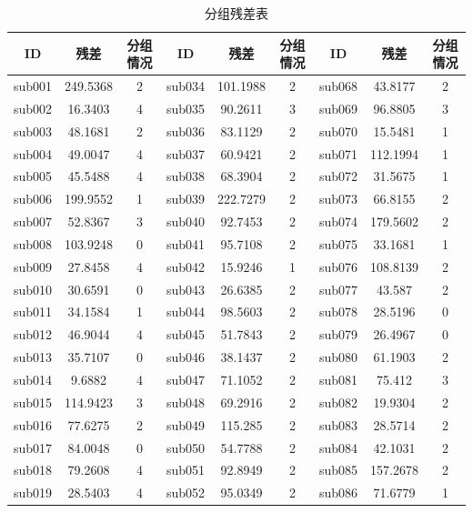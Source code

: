 \documentclass[bwprint]{gmcmthesis}
\begin{document}
\begin{table}[!ht]
    \centering
    \begin{spacing}{0.7}
    \caption{分组残差表}
    \label{分组残差表}
    \begin{tabular}{ccccccccc}
    \hline
        ID & 残差 & 分组情况 & ID & 残差 & 分组情况 & ID & 残差 & 分组情况 \\ \hline
        sub001 & 249.5368 & 2 & sub034 & 101.1988 & 2 & sub068 & 43.8177 & 2 \\ 
        sub002 & 16.3403 & 4 & sub035 & 90.2611 & 3 & sub069 & 96.8805 & 3 \\ 
        sub003 & 48.1681 & 2 & sub036 & 83.1129 & 2 & sub070 & 15.5481 & 1 \\ 
        sub004 & 49.0047 & 4 & sub037 & 60.9421 & 2 & sub071 & 112.1994 & 1 \\ 
        sub005 & 45.5488 & 4 & sub038 & 68.3904 & 2 & sub072 & 31.5675 & 1 \\ 
        sub006 & 199.9552 & 1 & sub039 & 222.7279 & 2 & sub073 & 66.8155 & 2 \\ 
        sub007 & 52.8367 & 3 & sub040 & 92.7453 & 2 & sub074 & 179.5602 & 2 \\ 
        sub008 & 103.9248 & 0 & sub041 & 95.7108 & 2 & sub075 & 33.1681 & 1 \\ 
        sub009 & 27.8458 & 4 & sub042 & 15.9246 & 1 & sub076 & 108.8139 & 2 \\ 
        sub010 & 30.6591 & 0 & sub043 & 26.6385 & 2 & sub077 & 43.587 & 2 \\ 
        sub011 & 34.1584 & 1 & sub044 & 98.5603 & 2 & sub078 & 28.5196 & 0 \\ 
        sub012 & 46.9044 & 4 & sub045 & 51.7843 & 2 & sub079 & 26.4967 & 0 \\ 
        sub013 & 35.7107 & 0 & sub046 & 38.1437 & 2 & sub080 & 61.1903 & 2 \\ 
        sub014 & 9.6882 & 4 & sub047 & 71.1052 & 2 & sub081 & 75.412 & 3 \\ 
        sub015 & 114.9423 & 3 & sub048 & 69.2916 & 2 & sub082 & 19.9304 & 2 \\ 
        sub016 & 77.6275 & 2 & sub049 & 115.285 & 2 & sub083 & 28.5714 & 2 \\ 
        sub017 & 84.0048 & 0 & sub050 & 54.7788 & 2 & sub084 & 42.1031 & 2 \\ 
        sub018 & 79.2608 & 4 & sub051 & 92.8949 & 2 & sub085 & 157.2678 & 2 \\ 
        sub019 & 28.5403 & 4 & sub052 & 95.0349 & 2 & sub086 & 71.6779 & 1 \\ 

\end{tabular}
\end{spacing}
\end{table}
\end{document}
